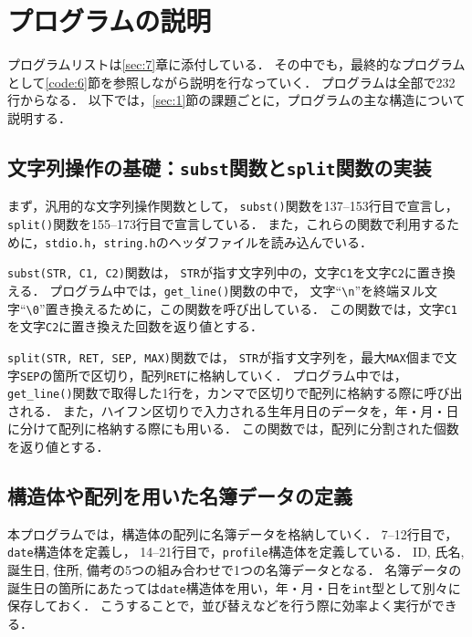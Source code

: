\documentclass[autodetect-engine,dvi=dvipdfmx,ja=standard,
               a4j,11pt]{bxjsarticle}
\begin{document}
\section{プログラムの説明} \label{sec:3}

プログラムリストは\ref{sec:7}章に添付している．
その中でも，最終的なプログラムとして\ref{code:6}節を参照しながら説明を行なっていく．
プログラムは全部で232行からなる．
以下では，\ref{sec:1}節の課題ごとに，プログラムの主な構造について説明する．

\subsection{文字列操作の基礎：\texttt{subst}関数と\texttt{split}関数の実装}

まず，汎用的な文字列操作関数として，
\verb|subst()|関数を137--153行目で宣言し，
\verb|split()|関数を155--173行目で宣言している．
また，これらの関数で利用するために，\verb|stdio.h|，\verb|string.h|のヘッダファイルを読み込んでいる．

\verb|subst(STR, C1, C2)|関数は，
\verb|STR|が指す文字列中の，文字\verb|C1|を文字\verb|C2|に置き換える．
プログラム中では，\verb|get_line()|関数の中で，
文字``\verb|\n|''を終端ヌル文字``\verb|\0|''置き換えるために，この関数を呼び出している．
この関数では，文字\verb|C1|を文字\verb|C2|に置き換えた回数を返り値とする．

\verb|split(STR, RET, SEP, MAX)|関数では，
\verb|STR|が指す文字列を，最大\verb|MAX|個まで文字\verb|SEP|の箇所で区切り，配列\verb|RET|に格納していく．
プログラム中では，\verb|get_line()|関数で取得した1行を，カンマで区切りで配列に格納する際に呼び出される．
また，ハイフン区切りで入力される生年月日のデータを，年・月・日に分けて配列に格納する際にも用いる．
この関数では，配列に分割された個数を返り値とする．

\subsection{構造体や配列を用いた名簿データの定義}

本プログラムでは，構造体の配列に名簿データを格納していく．
7--12行目で，\verb|date|構造体を定義し，
14--21行目で，\verb|profile|構造体を定義している．
ID, 氏名, 誕生日, 住所, 備考の5つの組み合わせで1つの名簿データとなる．
名簿データの誕生日の箇所にあたっては\verb|date|構造体を用い，年・月・日を\verb|int|型として別々に保存しておく．
こうすることで，並び替えなどを行う際に効率よく実行ができる．
\end{document}
